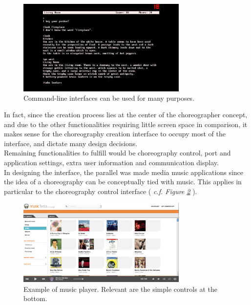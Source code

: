 \begin{figure}[ht]
   \centering
   \includegraphics[width=0.75\textwidth]{img/CommandLine.jpg}
   \caption{Command-line interfaces can be used for many purposes.}
   \label{img:CommandLine}
\end{figure}

In fact, since the creation process lies at the center of the choreographer concept, and due to the other functionalities requiring little screen space in comparison, it makes sense for the choreography creation interface to occupy most of the interface, and dictate many design decisions.\\

Remaining functionalities to fulfill would be choreography control, port and application settings, extra user information and communication display.\\

In designing the interface, the parallel was made media music applications since the idea of a choreography can be conceptually tied with music. This applies in particular to the choreography control interface ( \textit{c.f. Figure \ref{img:GoogleMusic}} ).\\

\begin{figure}[ht]
   \centering
   \includegraphics[width=0.75\textwidth]{img/GoogleMusic.png}
   \caption{Example of music player. Relevant are the simple controls at the bottom.}
   \label{img:GoogleMusic}
\end{figure}


